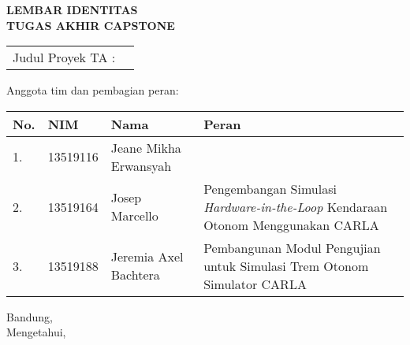 \clearpage
\pagestyle{empty}

\begin{center}
	\smallskip

	\Large \bfseries \MakeUppercase{
		Lembar Identitas \\
		Tugas Akhir Capstone
	}
	\vspace{0.5cm}

	\raggedright
	\begin{table}[h!]
		\large \bfseries
		\begin{onehalfspace}
		\begin{tabular}{p{} p{}}
			Judul Proyek TA : & \capstonetitle \\
		\end{tabular}
		\end{onehalfspace}
	\end{table}

	\normalsize \normalfont

	Anggota tim dan pembagian peran:

	\begin{table}[h!]
		\begin{onehalfspace}
		\begingroup
		\def\arraystretch{1.25}
		\begin{tabular}{|p{} | p{} | p{} | p{0.50\textwidth}|}
			\hline
			\textbf{No.} & \textbf{NIM} & \textbf{Nama}         & \textbf{Peran} \\
			\hline
			1.           & 13519116     & Jeane Mikha Erwansyah & \thetitle \\
			\hline
			2.           & 13519164     & Josep Marcello        & Pengembangan Simulasi \textit{Hardware-in-the-Loop} Kendaraan Otonom Menggunakan CARLA \\
			\hline
			3.           & 13519188     & Jeremia Axel Bachtera & Pembangunan Modul Pengujian untuk Simulasi Trem Otonom Simulator CARLA \\
			\hline
		\end{tabular}
		\endgroup
		\end{onehalfspace}
	\end{table}

	\vfill
	\begin{center}
		\normalsize \normalfont
		Bandung, \thedate \\
		Mengetahui,
	\end{center}
	\advisorapproval

\end{center}
\clearpage

